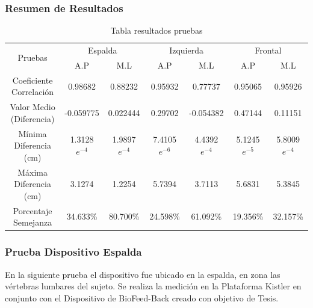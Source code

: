 \documentclass[12pt,a4paper]{article}
\newcommand{\nombreDispositivo}{Dispositivo de BioFeed-Back }
\begin{document}
\subsubsection{Resumen de Resultados}

\begin{table}[H]
	\label{table:resultadosPruebas}
	\centering
	\begin{tabular}{|c|c|c|c|c|c|c|}
		\hline
		\multirow{2}{*}{Pruebas} &
		\multicolumn{2}{c|}{Espalda} &
		\multicolumn{2}{c|}{Izquierda} &
		\multicolumn{2}{c|}{Frontal} \\
		\cline{2-7}
		& A.P & M.L & A.P  & M.L & A.P & M.L \\
		\hline
		\shortstack{Coeficiente\\Correlación} & 0.98682 & 0.88232 & 0.95932 & 0.77737 & 0.95065 & 0.95926 \\
		\hline
		\shortstack{Valor Medio \\ (Diferencia)} & -0.059775 & 0.022444 & 0.29702 & -0.054382 & 0.47144 & 0.11151 \\
		\hline
		\shortstack{Mínima\\Diferencia (cm)} & 1.3128$e^{-4}$ & 1.9897$e^{-4}$ & 7.4105$e^{-6}$ & 4.4392$e^{-4}$ & 5.1245$e^{-5}$ & 5.8009$e^{-4}$ \\
		\hline
		\shortstack{Máxima\\Diferencia (cm)} & 3.1274 & 1.2254 & 5.7394 & 3.7113 & 5.6831 & 5.3845 \\
		\hline
		\shortstack{Porcentaje\\Semejanza} & 34.633\% & 80.700\% & 24.598\% & 61.092\% &19.356\% & 32.157\% \\
		\hline
	\end{tabular}
	\caption{Tabla resultados pruebas}
\end{table}	
  
\subsubsection{Prueba Dispositivo Espalda} En la siguiente prueba el dispositivo fue ubicado en la espalda, en zona las vértebras lumbares del sujeto. Se realiza la medición en la Plataforma Kistler en conjunto con el \nombreDispositivo creado con objetivo de Tesis.
		
\end{document}
